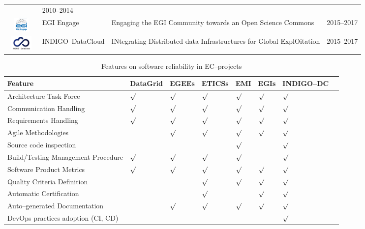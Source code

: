\documentclass[journal]{IEEEtran}
\begin{document}
\begin{table}[!h]
\begin{tabular}{p{1.6cm}p{1.5cm}p{3cm}l}
 & 2010--2014\\
\begin{minipage}{.3\textwidth}
\includegraphics[width=15mm,height=7.5mm]{images/egi_engage}
\end{minipage}
     & EGI Engage &
Engaging the EGI Community towards an Open Science Commons
 & 2015--2017\\
\begin{minipage}{.3\textwidth}
\includegraphics[width=15mm,height=7.5mm]{images/indigo}
\end{minipage}
     & INDIGO--DataCloud &
INtegrating Distributed data Infrastructures for Global ExplOitation
 & 2015--2017\\
\hline
\hline
\end{tabular}
\end{table}

\begin{table}[!h]
\renewcommand{\arraystretch}{1.3}
\caption{Features on software reliability in EC--projects}
\label{tab:feat}
\centering
\begin{tabular}{llllllll}
\hline
\hline
Feature & DataGrid & EGEEs & ETICSs & EMI & EGIs & INDIGO--DC\\
\hline
\hline
Architecture Task Force            &$\surd$&$\surd$&$\surd$&$\surd$&$\surd$&$\surd$\\
Communication Handling             &$\surd$&$\surd$&$\surd$&$\surd$&$\surd$&$\surd$\\
Requirements Handling              &$\surd$&$\surd$&$\surd$&$\surd$&$\surd$&$\surd$\\
Agile Methodologies                &       &$\surd$&$\surd$&$\surd$&$\surd$&$\surd$\\
Source code inspection             &       &       &       &$\surd$&       &$\surd$\\
Build/Testing Management Procedure &$\surd$&$\surd$&$\surd$&$\surd$&       &$\surd$\\
Software Product Metrics           &$\surd$&$\surd$&$\surd$&$\surd$&$\surd$&$\surd$\\
Quality Criteria Definition        &       &       &$\surd$&$\surd$&$\surd$&$\surd$\\
Automatic Certification            &       &       &$\surd$&       &$\surd$&$\surd$\\
Auto--generated Documentation      &       &$\surd$&$\surd$&$\surd$&$\surd$&$\surd$\\
DevOps practices adoption (CI, CD) &       &       &       &       &       &$\surd$\\
\hline
\hline
\end{tabular}
\end{table}
\end{document}
